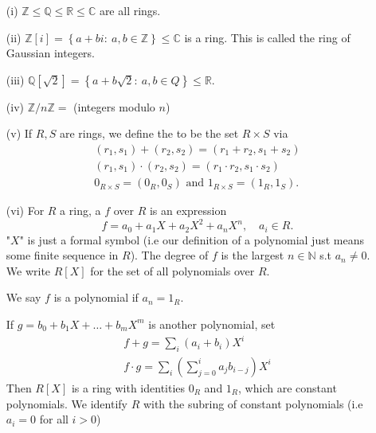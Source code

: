 \documentclass[egregdoesnotlikesansseriftitles,a4paper]{scrartcl}
\begin{document}
\begin{example*}
       \leavevmode
       \begin{itemize}
             \item[(i)] $\mathbb{Z} \leq \mathbb{Q} \leq \mathbb{R} \leq \mathbb{C}$ are all rings.
             \item[(ii)] $\mathbb{Z}[i]=\left\{a+bi: \ a,b \in \mathbb{Z}\right\} \leq \mathbb{C}$ is a ring. This is called the ring of Gaussian integers.
             \item[(iii)] $\mathbb{Q}[\sqrt{2}]=\left\{a+b \sqrt{2}: \ a,b \in Q\right\}\leq \mathbb{R}$.
             \item[(iv)] $\mathbb{Z}/n\mathbb{Z}=$ (integers modulo $n$)
             \item[(v)] If $R,S$ are rings, we define the  to be the set $R \times S$ via \begin{align*}
                  (r_1 ,s_1 )+ (r_2 ,s_2 )=(r_1 +r_2 ,s_1 +s_2 )\\
                  (r_1 ,s_1 )\cdot  (r_2 ,s_2 )=(r_1 \cdot r_2 ,s_1 \cdot s_2 )\\
                  0_{R \times S}=(0_{R},0_{S}) \text{ and } 1_{R \times S}=(1_R,1_S).
             \end{align*}  
             \item[(vi)] For $R$ a ring, a  $f$ over $R$ is an expression \[
             f=a_0 + a_1 X+a_2 X^2+ a_n X^{n}, \quad a_{i} \in R
             .\] "$X$" is just a formal symbol (i.e our definition of a polynomial just means some finite sequence in $R$). The degree of $f$ is the largest $n \in \mathbb{N}$ s.t $a_{n} \neq 0$. We write $R[X]$ for the set of all polynomials over $R$.

             \begin{remark}
                    We say $f$ is a  polynomial if $a_{n}=1_{R}$.
             \end{remark}

             If $g=b_0 +b_1 X + \ldots + b_{m}X^{m}$ is another polynomial, set 
             \begin{align*}
                   f+g= \sum_{i}^{}(a_{i}+b_{i})X^{i}\\
                   f \cdot g=\sum_{i}^{}(\sum_{j=0}^{i}a_{j}b_{i-j})X^{i}
             \end{align*}
             Then $R[X]$ is a ring with identities $0_{R}$ and $1_{R}$, which are constant polynomials. We identify $R$ with the subring of constant polynomials (i.e $a_{i}=0$ for all $i>0$)
       \end{itemize}
\end{example*}
\end{document}

